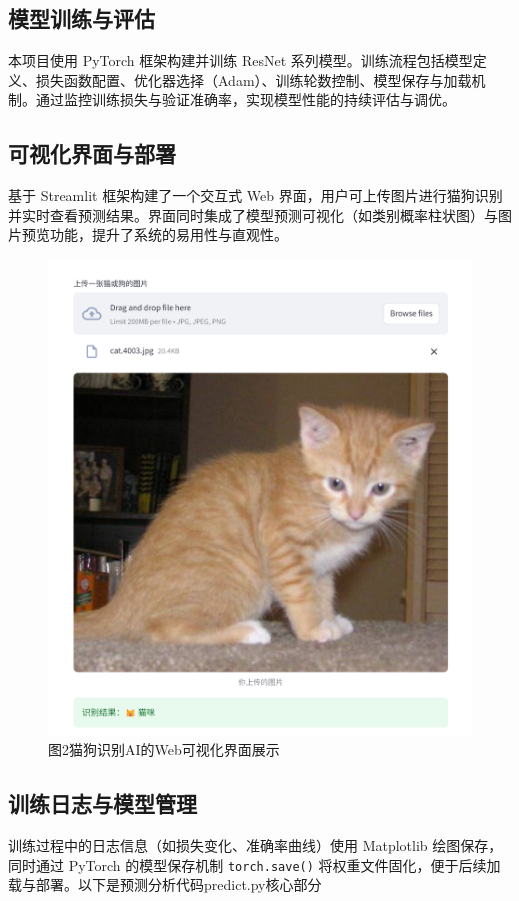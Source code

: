 \documentclass[10.5pt,compsoc]{CjC}
\theoremstyle{mystyle}
\begin{document}
\begin{CJK*}{GBK}{song}
\subsection{模型训练与评估}
本项目使用 PyTorch 框架构建并训练 ResNet 系列模型。训练流程包括模型定义、损失函数配置、优化器选择（Adam）、训练轮数控制、模型保存与加载机制。通过监控训练损失与验证准确率，实现模型性能的持续评估与调优。

\subsection{可视化界面与部署}
基于 Streamlit 框架构建了一个交互式 Web 界面，用户可上传图片进行猫狗识别并实时查看预测结果。界面同时集成了模型预测可视化（如类别概率柱状图）与图片预览功能，提升了系统的易用性与直观性。

\begin{figure}[htbp]
\centering
\includegraphics[width=0.9\linewidth]{web_demo.jpg}
{\begin{CJK*}{GBK}{hei} \caption{图2\quad 猫狗识别AI的Web可视化界面展示} \end{CJK*}}
\label{Fig:web_demo}
\end{figure}

\subsection{训练日志与模型管理}
训练过程中的日志信息（如损失变化、准确率曲线）使用 Matplotlib 绘图保存，同时通过 PyTorch 的模型保存机制 \texttt{torch.save()} 将权重文件固化，便于后续加载与部署。以下是预测分析代码predict.py核心部分


\end{CJK*}
\end{document}
